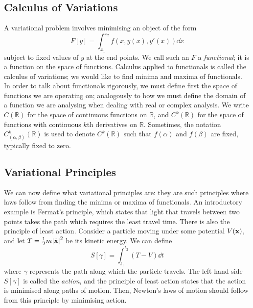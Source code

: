 \subsection{Calculus of Variations}
A variational problem involves minimising an object of the form
\[
	F[y] = \int_{x_1}^{x_2} f(x, y(x), y'(x)) \dd{x}
\]
subject to fixed values of \(y\) at the end points.
We call such an \(F\) a \textit{functional}; it is a function on the space of functions.
Calculus applied to functionals is called the calculus of variations; we would like to find minima and maxima of functionals.
In order to talk about functionals rigorously, we must define first the space of functions we are operating on; analogously to how we must define the domain of a function we are analysing when dealing with real or complex analysis.
We write \(C(\mathbb R)\) for the space of continuous functions on \(\mathbb R\), and \(C^k(\mathbb R)\) for the space of functions with continuous \(k\)th derivatives on \(\mathbb R\).
Sometimes, the notation \(C_{(\alpha, \beta)}^k(\mathbb R)\) is used to denote \(C^k(\mathbb R)\) such that \(f(\alpha)\) and \(f(\beta)\) are fixed, typically fixed to zero.

\subsection{Variational Principles}
We can now define what variational principles are: they are such principles where laws follow from finding the minima or maxima of functionals.
An introductory example is Fermat's principle, which states that light that travels between two points takes the path which requires the least travel time.
There is also the principle of least action.
Consider a particle moving under some potential \(V(\vb x)\), and let \(T = \frac{1}{2}m\abs{\dot {\vb x}}^2\) be its kinetic energy.
We can define
\[
	S[\gamma] = \int_{t_1}^{t_2} (T - V)\dd{t}
\]
where \(\gamma\) represents the path along which the particle travels.
The left hand side \(S[\gamma]\) is called the \textit{action}, and the principle of least action states that the action is minimised along paths of motion.
Then, Newton's laws of motion should follow from this principle by minimising action.
